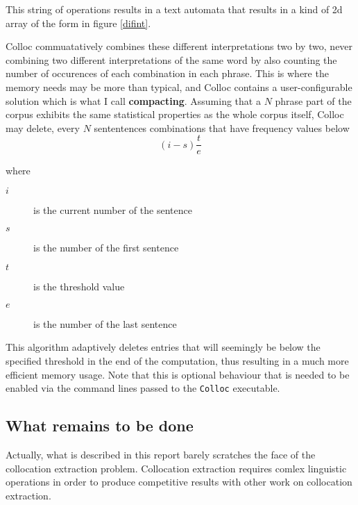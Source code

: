 \documentclass[a4paper,12pt,oneside]{article}
\begin{document}
This string of operations results in a text automata that results in a kind of 2d array of the form in figure \ref{difint}.



Colloc commuatatively combines these different interpretations two by two, never combining two different interpretations of the same word by also counting the number of occurences of each combination in each phrase. This is where the memory needs may be more than typical, and Colloc contains a user-configurable solution which is what I call \textbf{compacting}. Assuming that a $N$ phrase part of the corpus exhibits the same statistical properties as the whole corpus itself, Colloc may delete, every $N$ sententences combinations that have frequency values below $$(i-s)\frac{t}{e}$$

where
\begin{small}
	\begin{description}
		\item[$i$] is the current number of the sentence
		\item[$s$] is the number of the first sentence
		\item[$t$] is the threshold value
		\item[$e$] is the number of the last sentence
	\end{description}
\end{small}

This algorithm adaptively deletes entries that will seemingly be below the specified threshold in the end of the computation, thus resulting in a much more efficient memory usage. Note that this is optional behaviour that is needed to be enabled via the command lines passed to the \texttt{Colloc} executable.

\subsection{What remains to be done}
Actually, what is described in this report barely scratches the face of the collocation extraction problem. Collocation extraction requires comlex linguistic operations in order to produce competitive results with other work on collocation extraction.
\end{document}
